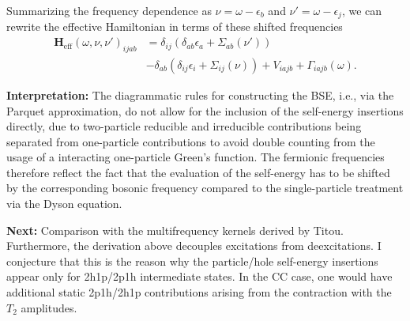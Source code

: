 \documentclass[aip,jcp,reprint,noshowkeys,superscriptaddress]{revtex4-1}
\begin{document}
Summarizing the frequency dependence as $\nu = \omega - \epsilon_b$ and $\nu' = \omega - \epsilon_j$, we can rewrite the effective Hamiltonian in terms of these shifted frequencies
\begin{align}
\mathbf{H}_{\text{eff}}(\omega, \nu, \nu')_{ijab} &= \delta_{ij} \left( \delta_{ab} \epsilon_a + \Sigma_{ab}(\nu') \right) \nonumber \\
&- \delta_{ab} \left(\delta_{ij} \epsilon_i +  \Sigma_{ij}(\nu) \right) + V_{iajb} + \Gamma_{iajb}(\omega).
\end{align}


\textbf{Interpretation:}
The diagrammatic rules for constructing the BSE, i.e., via the Parquet approximation, do not allow for the inclusion of the self-energy insertions directly, due to two-particle reducible and irreducible contributions being separated from one-particle contributions to avoid double counting from the usage of a interacting one-particle Green's function.
The fermionic frequencies therefore reflect the fact that the evaluation of the self-energy has to be shifted by the corresponding bosonic frequency compared to the single-particle treatment via the Dyson equation. 

\textbf{Next:}
Comparison with the multifrequency kernels derived by Titou.
Furthermore, the derivation above decouples excitations from deexcitations. 
I conjecture that this is the reason why the particle/hole self-energy insertions appear only for 2h1p/2p1h intermediate states.
In the CC case, one would have additional static 2p1h/2h1p contributions arising from the contraction with the $T_2$ amplitudes.


\end{document}
